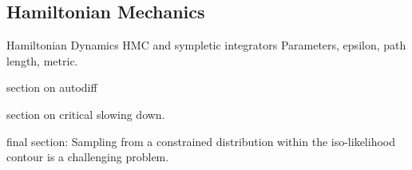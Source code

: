 \documentclass[11pt]{article}
\begin{document}
\subsection{Hamiltonian Mechanics}\label{subsec:hamiltonian_mechanics}

    Hamiltonian Dynamics
    HMC and sympletic integrators
    Parameters, epsilon, path length, metric.

    section on autodiff

    section on critical slowing down.

    final section: Sampling from a constrained distribution within the iso-likelihood contour is a challenging problem.
\end{document}
